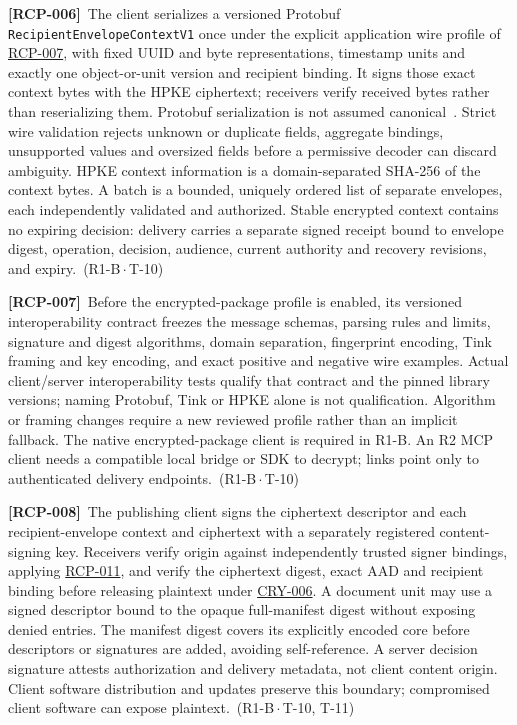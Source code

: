 \documentclass[11pt,a4paper]{article}
\newcommand{\code}[1]{{\small\nolinkurl{#1}}}
\newcommand{\rr}[1]{\hyperlink{req:#1}{#1}}
\newcommand{\reqtag}[2]{{\footnotesize\color{accent}(#1\,$\cdot$\,#2)}}
\newcommand{\req}[4]{\par\noindent\hypertarget{req:#1}{\textbf{[#1]}}\ #4\ \reqtag{#2}{#3}\par}
\begin{document}
\req{RCP-006}{R1-B}{T-10}{The client serializes a versioned Protobuf \code{RecipientEnvelopeContextV1} once under the explicit application wire profile of \rr{RCP-007}, with fixed UUID and byte representations, timestamp units and exactly one object-or-unit version and recipient binding. It signs those exact context bytes with the HPKE ciphertext; receivers verify received bytes rather than reserializing them. Protobuf serialization is not assumed canonical~\cite{protobufCanonical}. Strict wire validation rejects unknown or duplicate fields, aggregate bindings, unsupported values and oversized fields before a permissive decoder can discard ambiguity. HPKE context information is a domain-separated SHA-256 of the context bytes. A batch is a bounded, uniquely ordered list of separate envelopes, each independently validated and authorized. Stable encrypted context contains no expiring decision: delivery carries a separate signed receipt bound to envelope digest, operation, decision, audience, current authority and recovery revisions, and expiry.}
\req{RCP-007}{R1-B}{T-10}{Before the encrypted-package profile is enabled, its versioned interoperability contract freezes the message schemas, parsing rules and limits, signature and digest algorithms, domain separation, fingerprint encoding, Tink framing and key encoding, and exact positive and negative wire examples. Actual client/server interoperability tests qualify that contract and the pinned library versions; naming Protobuf, Tink or HPKE alone is not qualification. Algorithm or framing changes require a new reviewed profile rather than an implicit fallback. The native encrypted-package client is required in R1-B. An R2 MCP client needs a compatible local bridge or SDK to decrypt; links point only to authenticated delivery endpoints.}
\req{RCP-008}{R1-B}{T-10, T-11}{The publishing client signs the ciphertext descriptor and each recipient-envelope context and ciphertext with a separately registered content-signing key. Receivers verify origin against independently trusted signer bindings, applying \rr{RCP-011}, and verify the ciphertext digest, exact AAD and recipient binding before releasing plaintext under \rr{CRY-006}. A document unit may use a signed descriptor bound to the opaque full-manifest digest without exposing denied entries. The manifest digest covers its explicitly encoded core before descriptors or signatures are added, avoiding self-reference. A server decision signature attests authorization and delivery metadata, not client content origin. Client software distribution and updates preserve this boundary; compromised client software can expose plaintext.}
\end{document}
